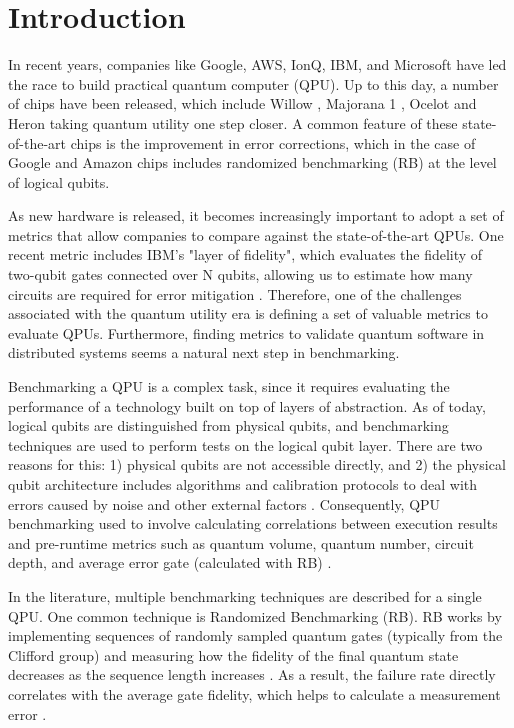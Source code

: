 \section*{Introduction}

In recent years, companies like Google, AWS, IonQ, IBM, and Microsoft have led the race to build practical quantum computer (QPU). Up to this day, a number of chips have been released, which include Willow \cite{acharyaQuantumErrorCorrection2025_2025}, Majorana 1 \cite{aasenRoadmapFaultTolerant2025_2025}, Ocelot \cite{puttermanHardwareefficientQuantumErrora_2025} and Heron \cite{abughanemIBMQuantumComputers_2025} taking quantum utility one step closer. A common feature of these state-of-the-art chips is the improvement in error corrections, which in the case of Google and Amazon chips includes randomized benchmarking (RB) at the level of logical qubits.

As new hardware is released, it becomes increasingly important to adopt a set of metrics that allow companies to compare against the state-of-the-art QPUs. One recent metric includes IBM's "layer of fidelity", which evaluates the fidelity of two-qubit gates connected over N qubits, allowing us to estimate how many circuits are required for error mitigation \cite{mckayBenchmarkingQuantumProcessor2023_2023}. Therefore, one of the challenges associated with the quantum utility era is defining a set of valuable metrics to evaluate QPUs. Furthermore, finding metrics to validate quantum software in distributed systems seems a natural next step in benchmarking.

Benchmarking a QPU is a complex task, since it requires evaluating the performance of a technology built on top of layers of abstraction. As of today, logical qubits are distinguished from physical qubits, and benchmarking techniques are used to perform tests on the logical qubit layer. There are two reasons for this: 1) physical qubits are not accessible directly, and 2) the physical qubit architecture includes algorithms and calibration protocols to deal with errors caused by noise and other external factors \cite{campbellRoadsFaulttolerantUniversal2017_2017, tomitaLowdistanceSurfaceCodes_2014}. Consequently, QPU benchmarking used to involve calculating correlations between execution results and pre-runtime metrics such as quantum volume, quantum number, circuit depth, and average error gate (calculated with RB) \cite{proctorBenchmarkingQuantumComputers2025_2025}.

In the literature, multiple benchmarking techniques are described for a single QPU. One common technique is Randomized Benchmarking (RB). RB works by implementing sequences of randomly sampled quantum gates (typically from the Clifford group) and measuring how the fidelity of the final quantum state decreases as the sequence length increases \cite{emersonScalableNoiseEstimation_2005}. As a result, the failure rate directly correlates with the average gate fidelity, which helps to calculate a measurement error \cite{magesanRobustRandomizedBenchmarking_2011}.

